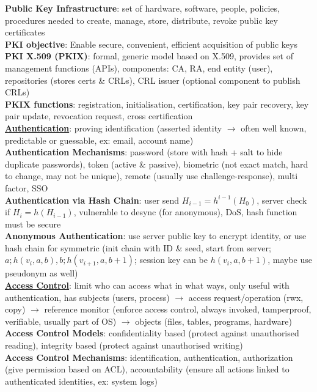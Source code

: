 \documentclass[a4paper]{article}
\begin{document}
\begin{multicols}{2}
        \textbf{Public Key Infrastructure}: set of hardware, software, people, policies, procedures needed to create, manage, store, distribute, revoke public key certificates\\
        \textbf{PKI objective}: Enable secure, convenient, efficient acquisition of public keys\\
        \textbf{PKI X.509 (PKIX)}: formal, generic model based on X.509, provides set of management functions (APIs), components: CA, RA, end entity (user), repositories (stores certs \& CRLs), CRL issuer (optional component to publish CRLs)\\
        \textbf{PKIX functions}: registration, initialisation, certification, key pair recovery, key pair update, revocation request, cross certification\\
        \underline{\textbf{Authentication}}: proving identification (asserted identity $\to$ often well known, predictable or guessable, ex: email, account name)\\
        \textbf{Authentication Mechanisms}: password (store with hash + salt to hide duplicate passwords), token (active \& passive), biometric (not exact match, hard to change, may not be unique), remote (usually use challenge-response), multi factor, SSO\\
        \textbf{Authentication via Hash Chain}: user send $H_{i-1} = h^{i-1}(H_0)$, server check if $H_i = h(H_{i-1})$, vulnerable to desync (for anonymous), DoS, hash function must be secure\\
        \textbf{Anonymous Authentication}: use server public key to encrypt identity, or use hash chain for symmetric (init chain with ID \& seed, start from server; $a; h(v_i,a,b), b; h(v_{i+1}, a, b+1)$; session key can be $h(v_i, a, b+1)$, maybe use pseudonym as well)\\
        \underline{\textbf{Access Control}}: limit who can access what in what ways, only useful with authentication, has subjects (users, process) $\to$ access request/operation (rwx, copy) $\to$ reference monitor (enforce access control, always invoked, tamperproof, verifiable, usually part of OS) $\to$ objects (files, tables, programs, hardware)\\
        \textbf{Access Control Models}: confidentiality based (protect against unauthorised reading), integrity based (protect against unauthorised writing)\\
        \textbf{Access Control Mechanisms}: identification, authentication, authorization (give permission based on ACL), accountability (ensure all actions linked to authenticated identities, ex: system logs)\\

\end{multicols}
\end{document}
